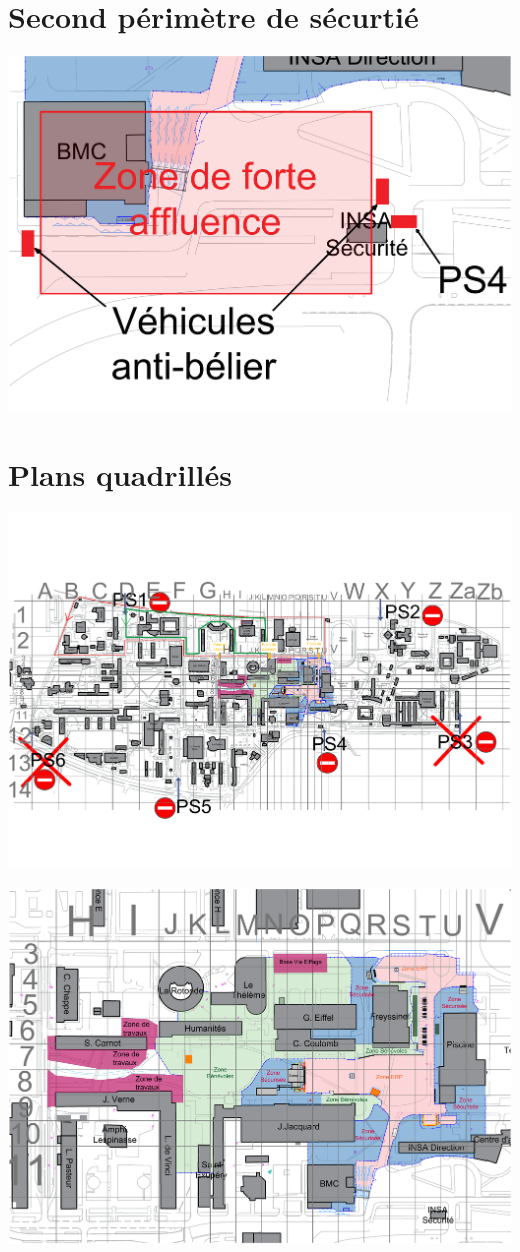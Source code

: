 \documentclass[hidelinks, paper=a4, fontsize=13pt]{report}
\begin{document}
\section{Second périmètre de sécurtié}
	\begin{center}\includegraphics[width=.95\textheight, angle=90]{Exports/Plan_24h_44eme-Vehicules_beliers}\end{center}

\section{Plans quadrillés}
	\begin{center}\includegraphics[width=.95\textheight, angle=90]{Exports/Plan_24h_44eme-Quadrillage_campus}\end{center}
	\begin{center}\includegraphics[width=.95\textheight, angle=90]{Exports/Plan_24h_44eme-Quadrillage_zoom}\end{center}
\end{document}
